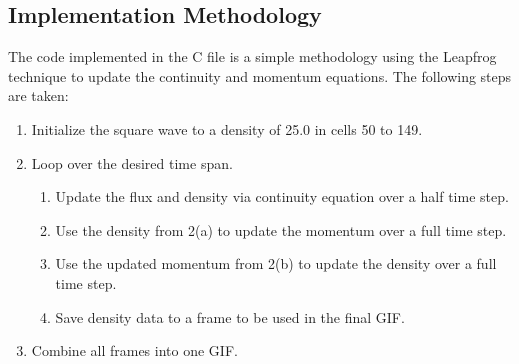 \documentclass{article}
\begin{document}
\subsection{Implementation Methodology}
The code implemented in the C file is a simple methodology using the Leapfrog 
technique to update the continuity and momentum equations. The following 
steps are taken:
\begin{enumerate}
    \item Initialize the square wave to a density of 25.0 in cells 50 to 149.
    \item Loop over the desired time span.
    \begin{enumerate}
        \item Update the flux and density via continuity equation over a half time step.
        \item Use the density from 2(a) to update the momentum over a full time step.
        \item Use the updated momentum from 2(b) to update the density over a full time step.
        \item Save density data to a frame to be used in the final GIF.
    \end{enumerate}
    \item Combine all frames into one GIF.
\end{enumerate}
\end{document}
